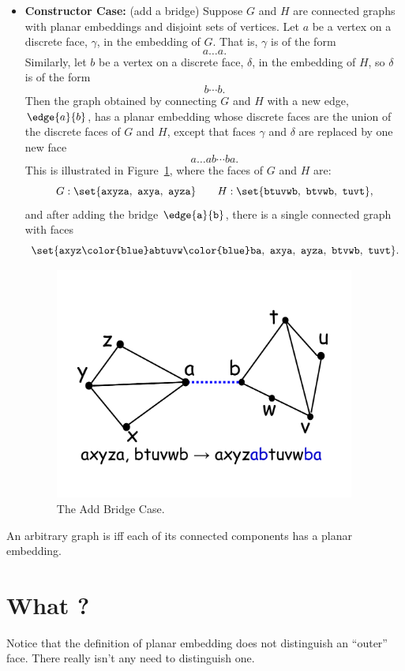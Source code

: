 \begin{definition}
\begin{itemize}
\item \textbf{Constructor Case:} (add a bridge) Suppose $G$ and $H$ are
connected graphs with planar embeddings and disjoint sets of vertices.
Let $a$ be a vertex on a discrete face, $\gamma$, in the embedding of
$G$.  That is, $\gamma$ is of the form
\[
a\dots a.
\]
Similarly, let $b$ be a vertex on a discrete face, $\delta$, in the
embedding of $H$, so $\delta$ is of the form
\[
b\cdots b.
\]
Then the graph obtained by connecting $G$ and $H$ with a new edge,
$\edge{a}{b}$, has a planar embedding whose discrete faces are the union of
the discrete faces of $G$ and $H$, except that faces $\gamma$ and $\delta$
are replaced by one new face
\[
a\dots ab\cdots ba.
\]
This is illustrated in Figure~\ref{fig:add-bridge}, where the faces of
$G$ and $H$ are:
\[
G: \set{\texttt{axyza},\ \texttt{axya},\ \texttt{ayza}}
    \qquad H: \set{\texttt{btuvwb},\ \texttt{btvwb},\ \texttt{tuvt}},
\]
and after adding the bridge $\edge{\texttt{a}}{\texttt{b}}$, there is a
single connected graph with faces
\[
\set{\texttt{axyz{\color{blue}ab}tuvw{\color{blue}ba}},\ 
         \texttt{axya},\ \texttt{ayza},\ \texttt{btvwb},\ \texttt{tuvt}}.
\]
\begin{figure}[h]
\centering \includegraphics[height=3in]{figures/add-bridge}
\caption{The Add Bridge Case.}
\label{fig:add-bridge}
\end{figure}

\end{itemize}

An arbitrary graph is  iff each of its connected components
has a planar embedding.

\end{definition}

\section{What ?}
Notice that the definition of planar embedding does not distinguish an
``outer'' face.  There really isn't any need to distinguish one.

